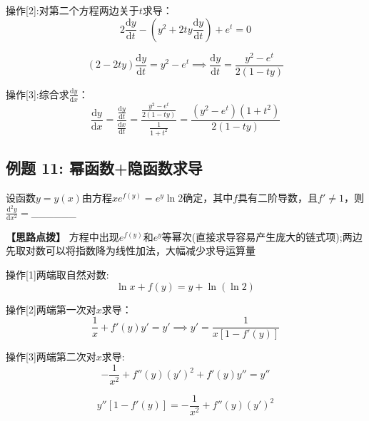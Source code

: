 \documentclass[11pt,a4paper,UTF8]{ctexart}
\begin{document}
操作[2]:对第二个方程两边关于$t$求导：
\begin{equation*}
2\frac{\mathrm{d}y}{\mathrm{d}t} - \left(y^2 + 2ty\frac{\mathrm{d}y}{\mathrm{d}t}\right) + e^t = 0
\end{equation*}




\begin{equation*}
(2 - 2ty)\frac{\mathrm{d}y}{\mathrm{d}t} = y^2 - e^t \implies \frac{\mathrm{d}y}{\mathrm{d}t} = \frac{y^2 - e^t}{2(1 - ty)}
\end{equation*}

操作[3]:综合求$\frac{\mathrm{d}y}{\mathrm{d}x}$：
\begin{equation*}
\frac{\mathrm{d}y}{\mathrm{d}x} = \frac{\frac{\mathrm{d}y}{\mathrm{d}t}}{\frac{\mathrm{d}x}{\mathrm{d}t}} = \frac{\frac{y^2 - e^t}{2(1 - ty)}}{\frac{1}{1+t^2}} = \frac{(y^2 - e^t)(1+t^2)}{2(1 - ty)}
\end{equation*}



\subsection{例题 11: 幂函数+隐函数求导}

设函数$y = y(x)$由方程$xe^{f(y)} = e^y \ln 2$确定，其中$f$具有二阶导数，且$f' \neq 1$，则$\frac{\mathrm{d}^2y}{\mathrm{d}x^2} =$\_\_\_\_\_\_

\textbf{\color{DeepPurple}【思路点拨】} 方程中出现$e^{f(y)}$和$e^y$等幂次(直接求导容易产生庞大的链式项);两边先取对数可以将指数降为线性加法，大幅减少求导运算量


操作[1]两端取自然对数:
\begin{equation*}
\ln x + f(y) = y + \ln(\ln 2)
\end{equation*}


操作[2]两端第一次对$x$求导：
\begin{equation*}
\frac{1}{x} + f'(y)y' = y' \implies y' = \frac{1}{x[1 - f'(y)]}
\end{equation*}


操作[3]两端第二次对$x$求导:
\begin{equation*}
-\frac{1}{x^2} + f''(y)(y')^2 + f'(y)y'' = y''
\end{equation*}



\begin{equation*}
y''[1 - f'(y)] = -\frac{1}{x^2} + f''(y)(y')^2
\end{equation*}
\end{document}

